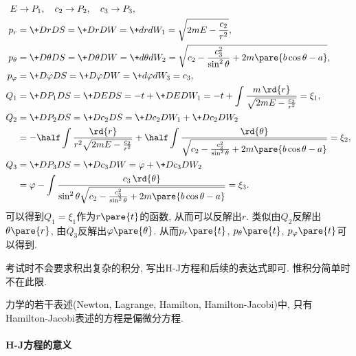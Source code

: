 \documentclass[../LectureNotes.tex]{subfiles}
\begin{document}
\begin{sample}
\begin{ex}[习题3.22]
\begin{align*}
            E &\rightarrow P_1,\quad c_2 \rightarrow P_2,\quad c_3\rightarrow P_3, \\
            p_r &= \+DrDS = \+DrDW = \+drd{W_1} = \sqrt{2mE - \frac{c_2}{r^2}}, \\
            p_\theta &= \+D\theta DS = \+D\theta DW = \+d\theta d{W_2} = \sqrt{c_2 - \frac{c_3^2}{\sin^2\theta} + 2m\pare{b\cos\theta - a}}, \\
            p_\varphi &= \+D\varphi DS = \+D\varphi DW = \+d\varphi d{W_3} = c_3, \\
            Q_1 &= \+D{P_1}DS = \+DEDS = -t + \+DED{W_1} = -t + \int \frac{m\,\rd{r}}{\sqrt{2mE - \frac{c_2}{r^2}}} = \xi_1, \\
            Q_2 &= \+D{P_2}DS = \+D{c_2}DS = \+D{c_2}D{W_1} + \+D{c_2}D{W_2} \\
            &= -\half \int \frac{\rd{r}}{r^2\sqrt{2mE - \frac{c_2}{r^2}}} + \half \int \frac{\rd{\theta}}{\sqrt{c_2 - \frac{c_3^2}{\sin^2\theta} + 2m\pare{b\cos\theta - a}}} = \xi_2, \\
            Q_3 &= \+D{P_3}DS = \+D{c_3}DW = \varphi + \+D{c_3}D{W_2} \\
            &= \varphi - \int \frac{c_3\,\rd{\theta}}{\sin^2\theta\sqrt{c_2 - \frac{c_3^2}{\sin^2\theta} + 2m\pare{b\cos\theta - a}}} = \xi_3.
        \end{align*}
        可以得到$Q_1=\xi_1$作为$r\pare{t}$的函数, 从而可以反解出$r$. 类似由$Q_2$反解出$\theta\pare{r}$, 由$Q_3$反解出$\varphi\pare{\theta}$. 从而$p_r\pare{t}$, $p_\theta\pare{t}$, $p_\varphi\pare{t}$可以得到.
    \end{ex}
\end{sample}
\begin{remark}
    考试时不会要求积出复杂的积分, 写出H-J方程和后续的表达式即可. 惟积分简单时不在此限.
\end{remark}
\begin{remark}
    力学的若干表述(Newton, Lagrange, Hamilton, Hamilton-Jacobi)中, 只有Hamilton-Jacobi表述的方程是偏微分方程.
\end{remark}

\paragraph{H-J方程的意义} %
\label{par:h_j方程的意义}
\end{document}

